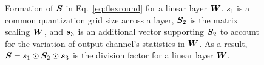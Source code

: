 \documentclass{article}
\theoremstyle{plain}
\theoremstyle{definition}
\theoremstyle{remark}
\begin{document}


\begin{figure}
    \centering
    \caption{Formation of ${\bm{S}}$ in Eq.~\ref{eq:flexround} for a linear layer ${\bm{W}}$. $s_1$ is a common quantization grid size across a layer, ${\bm{S}}_2$ is the matrix scaling ${\bm{W}}$, and ${\bm{s}}_3$ is an additional vector supporting ${\bm{S}}_2$ to account for the variation of output channel's statistics in ${\bm{W}}$. As a result, ${\bm{S}} = s_1 \odot {\bm{S}}_2 \odot {\bm{s}}_3$ is the division factor for a linear layer ${\bm{W}}$. }
    \label{fig:formation}
    \vskip -0.15in
\end{figure}
\end{document}
